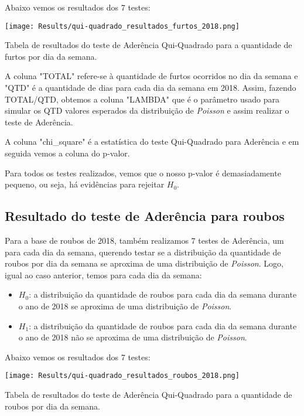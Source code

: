 \documentclass[
	12pt,
	openright,			%
	twoside,			%
	a4paper,			%
	chapter=TITLE,		%
	section=TITLE,		%
	subsection=TITLE,	%
	subsubsection=TITLE,%
	english,			%
	french,				%
	spanish,			%
	brazil				%
	]{abntex2}
\begin{document}
Abaixo vemos os resultados dos 7 testes:

\begin{table}[H]
\centering
\centerline{\texttt{[image: Results/qui-quadrado\_resultados\_furtos\_2018.png]}}
\caption{Tabela de resultados do teste de Aderência Qui-Quadrado para a quantidade de furtos por dia da semana.}
\end{table}

A coluna "TOTAL" refere-se à quantidade de furtos ocorridos no dia da semana e "QTD" é a quantidade de dias para cada dia da semana em 2018. Assim, fazendo TOTAL/QTD, obtemos a coluna "LAMBDA" que é o parâmetro usado para simular os QTD valores esperados da distribuição de \textit{Poisson} e assim realizar o teste de Aderência.

A coluna "chi\_square" é a estatística do teste Qui-Quadrado para Aderência e em seguida vemos a coluna do p-valor.

Para todos os testes realizados, vemos que o nosso p-valor é demasiadamente pequeno, ou seja, há evidências para rejeitar $H_0$.

\subsection{Resultado do teste de Aderência para roubos}
Para a base de roubos de 2018, também realizamos 7 testes de Aderência, um para cada dia da semana, querendo testar se a distribuição da quantidade de roubos por dia da semana se aproxima de uma distribuição de \textit{Poisson}.
Logo, igual ao caso anterior, temos para cada dia da semana:

\begin{itemize}
    \item $H_0$: a distribuição da quantidade de roubos para cada dia da semana durante o ano de 2018 se aproxima de uma distribuição de \textit{Poisson}.
    \item $H_1$: a distribuição da quantidade de roubos para cada dia da semana durante o ano de 2018 não se aproxima de uma distribuição de \textit{Poisson}.
\end{itemize}

Abaixo vemos os resultados dos 7 testes:

\begin{table}[H]
\centering
\centerline{\texttt{[image: Results/qui-quadrado\_resultados\_roubos\_2018.png]}}
\caption{Tabela de resultados do teste de Aderência Qui-Quadrado para a quantidade de roubos por dia da semana.}
\end{table}
\end{document}
